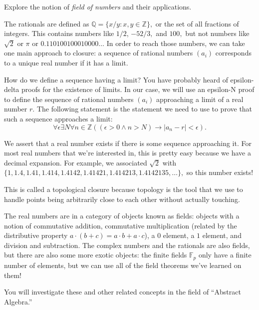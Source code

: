 \documentclass{article}
\begin{document}
    Explore the notion of {\it field of numbers} and their applications.

    The rationals are defined as $\mathbb{Q} = \{x/y : x,y\in\mathbb{Z}\},$ or the set of all fractions of integers.
    This contains numbers like $1/2$, $-52/3,$ and $100,$ but not numbers like $\sqrt 2$ or $\pi$ or $0.110100100010000\ldots$
    In order to reach those numbers, we can take one main approach to closure: a sequence of rational numbers $(a_i)$ corresponds to a unique real number if it has a limit.

    How do we define a sequence having a limit?
    You have probably heard of epsilon-delta proofs for the existence of limits.
    In our case, we will use an epsilon-N proof to define the sequence of rational numbers $(a_i)$ approaching a limit of a real number $r.$
    The following statement is the statement we need to use to prove that such a sequence approaches a limit:
    $$\forall\epsilon\exists N\forall n\in\mathbb{Z} ((\epsilon>0\land n>N) \to |a_n-r|<\epsilon).$$

    We assert that a real number exists if there is some sequence approaching it.
    For most real numbers that we're interested in, this is pretty easy because we have a decimal expansion.
    For example, we associated $\sqrt 2$ with $\{1,1.4,1.41,1.414,1.4142,1.41421,1.414213,1.4142135,\ldots\},$ so this number exists!

    This is called a topological closure because topology is the tool that we use to handle points being arbitrarily close to each other without actually touching.
    

    The real numbers are in a category of objects known as fields: objects with a notion of commutative addition, commutative multiplication (related by the distributive property $a\cdot (b+c)=a\cdot b + a\cdot c$), a $0$ element, a $1$ element, and division and subtraction.
    The complex numbers and the rationals are also fields, but there are also some more exotic objects: the finite fields $\mathbb{F}_p$ only have a finite number of elements, but we can use all of the field theorems we've learned on them!

    You will investigate these and other related concepts in the field of ``Abstract Algebra.''
\end{document}
